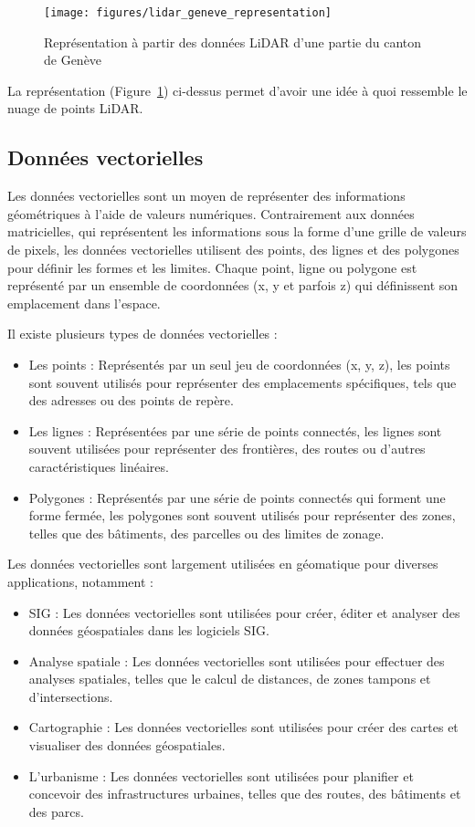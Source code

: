 \begin{figure}[htbp]
    \centering
    \texttt{[image: figures/lidar\_geneve\_representation]}
    \caption{Représentation à partir des données LiDAR d'une partie du canton de Genève \citep{sitg_lidar_2023}}
    \label{fig:lidar_geneve_representation}
\end{figure}

La représentation (Figure~\ref{fig:lidar_geneve_representation}) ci-dessus permet d'avoir une idée à quoi ressemble le nuage de points LiDAR.

\subsection{Données vectorielles}

Les données vectorielles sont un moyen de représenter des informations géométriques à l'aide de valeurs numériques. Contrairement aux données matricielles, qui représentent les informations sous la forme d'une grille de valeurs de pixels, les données vectorielles utilisent des points, des lignes et des polygones pour définir les formes et les limites. Chaque point, ligne ou polygone est représenté par un ensemble de coordonnées (x, y et parfois z) qui définissent son emplacement dans l'espace.

Il existe plusieurs types de données vectorielles :
\begin{itemize}
    \item Les points : Représentés par un seul jeu de coordonnées (x, y, z), les points sont souvent utilisés pour représenter des emplacements spécifiques, tels que des adresses ou des points de repère.
    \item Les lignes : Représentées par une série de points connectés, les lignes sont souvent utilisées pour représenter des frontières, des routes ou d'autres caractéristiques linéaires.
    \item Polygones : Représentés par une série de points connectés qui forment une forme fermée, les polygones sont souvent utilisés pour représenter des zones, telles que des bâtiments, des parcelles ou des limites de zonage.
\end{itemize}

Les données vectorielles sont largement utilisées en géomatique pour diverses applications, notamment :
\begin{itemize}
    \item SIG : Les données vectorielles sont utilisées pour créer, éditer et analyser des données géospatiales dans les logiciels SIG.
    \item Analyse spatiale : Les données vectorielles sont utilisées pour effectuer des analyses spatiales, telles que le calcul de distances, de zones tampons et d'intersections.
    \item Cartographie : Les données vectorielles sont utilisées pour créer des cartes et visualiser des données géospatiales.
    \item L'urbanisme : Les données vectorielles sont utilisées pour planifier et concevoir des infrastructures urbaines, telles que des routes, des bâtiments et des parcs.
\end{itemize}

